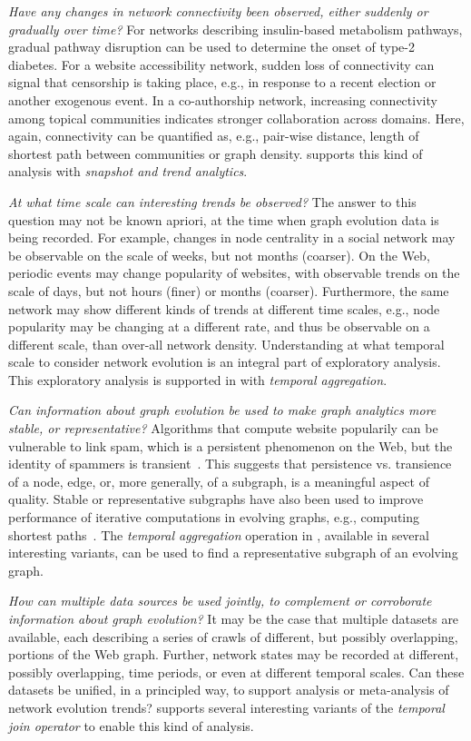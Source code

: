 {\em Have any changes in network connectivity been observed, either
  suddenly or gradually over time?}  For networks describing
insulin-based metabolism pathways, gradual pathway disruption can be
used to determine the onset of type-2 diabetes.  For a website
accessibility network, sudden loss of connectivity can signal that
censorship is taking place, e.g., in response to a recent election or
another exogenous event.  In a co-authorship network, increasing
connectivity among topical communities indicates stronger
collaboration across domains.  Here, again, connectivity can be
quantified as, e.g., pair-wise distance, length of shortest path
between communities or graph density.  \ql supports this kind of
analysis with {\em snapshot and trend analytics}.

{\em At what time scale can interesting trends be observed?} The
answer to this question may not be known apriori, at the time when
graph evolution data is being recorded.  For example, changes in node
centrality in a social network may be observable on the scale of
weeks, but not months (coarser).  On the Web, periodic events may
change popularity of websites, with observable trends on the scale of
days, but not hours (finer) or months (coarser).  Furthermore, the
same network may show different kinds of trends at different time
scales, e.g., node popularity may be changing at a different rate, and
thus be observable on a different scale, than over-all network
density.  Understanding at what temporal scale to consider network
evolution is an integral part of exploratory analysis.  This
exploratory analysis is supported in \ql with {\em temporal
  aggregation}.

{\em Can information about graph evolution be used to make graph
  analytics more stable, or representative?}  Algorithms that compute
website popularily can be vulnerable to link spam, which is a
persistent phenomenon on the Web, but the identity of spammers is
transient~\cite{DBLP:conf/cikm/YangQZGL07}.  This suggests that
persistence vs. transience of a node, edge, or, more generally, of a
subgraph, is a meaningful aspect of quality.  Stable or representative
subgraphs have also been used to improve performance of iterative
computations in evolving graphs, e.g., computing shortest
paths~\cite{Ren2011}.  The {\em temporal aggregation} operation in
\ql, available in several interesting variants, can be used to find a
representative subgraph of an evolving graph.

{\em How can multiple data sources be used jointly, to complement or
  corroborate information about graph evolution?}  It may be the case
that multiple datasets are available, each describing a series of
crawls of different, but possibly overlapping, portions of the Web
graph.  Further, network states may be recorded at different, possibly
overlapping, time periods, or even at different temporal scales.  Can
these datasets be unified, in a principled way, to support analysis or
meta-analysis of network evolution trends?  \ql supports several
interesting variants of the {\em temporal join operator} to enable
this kind of analysis.

